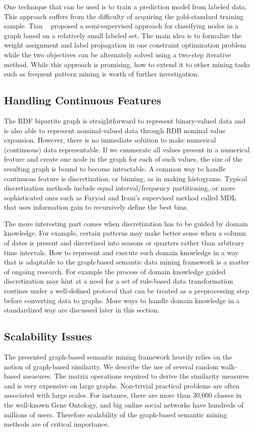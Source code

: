 One technique that can be used is to train a prediction model from labeled data. This approach suffers from the difficulty of acquiring the gold-standard training sample. Tian \etal~\cite{Tian09} proposed a semi-supervised approach for classifying nodes in a graph based on a relatively small labeled set. The main idea is to formalize the weight assignment and label propagation in one constraint optimization problem while the two objectives can be alternately solved using a two-step iterative method. While this approach is promising, how to extend it to other mining tasks such as frequent pattern mining is worth of further investigation.

\subsection{Handling Continuous Features}
The RDF bipartite graph is straightforward to represent binary-valued data and is also able to represent nominal-valued data through RDB nominal value expansion. However, there is no immediate solution to make numerical (continuous) data representable. If we enumerate all values present in a numerical feature and create one node in the graph for each of such values, the size of the resulting graph is bound to become intractable. A common way to handle continuous feature is discretization, or binning, as in making histograms. Typical discretization methods include equal interval/frequency partitioning, or more sophisticated ones such as Fayyad and Irani's supervised method called MDL~\cite{FayyadI93discretization} that uses information gain to recursively define the best bins.

The more interesting part comes when discretization has to be guided by domain knowledge. For example, certain patterns may make better sense when a column of dates is present and discretized into seasons or quarters rather than arbitrary time intervals. How to represent and execute such domain knowledge in a way that is adaptable to the graph-based semantic data mining framework is a matter of ongoing research. For example the process of domain knowledge guided discretization may hint at a need for a set of rule-based data transformation routines under a well-defined protocol that can be treated as a preprocessing step before converting data to graphs. More ways to handle domain knowledge in a standardized way are discussed later in this section.

\subsection{Scalability Issues}
The presented graph-based semantic mining framework heavily relies on the notion of graph-based similarity. We describe the use of several random walk-based measures. The matrix operations required to derive the similarity measures and is very expensive on large graphs. Non-trivial practical problems are often associated with large scales. For instance, there are more than 30,000 classes in the well-known Gene Ontology, and big online social networks have hundreds of millions of users. Therefore scalability of the graph-based semantic mining methods are of critical importance.

